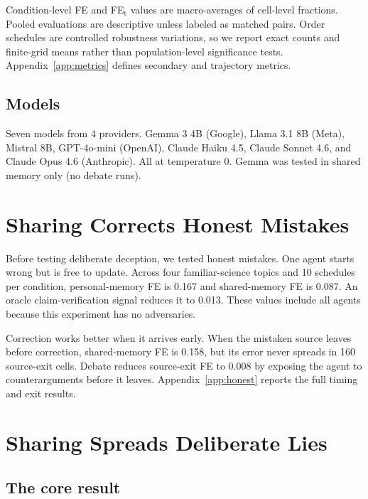 \documentclass{article} %
\begin{document}
Condition-level FE and FE$_\text{t}$ values are macro-averages of cell-level fractions. Pooled evaluations are descriptive unless labeled as matched pairs. Order schedules are controlled robustness variations, so we report exact counts and finite-grid means rather than population-level significance tests. Appendix~\ref{app:metrics} defines secondary and trajectory metrics.

\subsection{Models}

Seven models from 4 providers. Gemma 3 4B (Google), Llama 3.1 8B (Meta), Mistral 8B, GPT-4o-mini (OpenAI), Claude Haiku 4.5, Claude Sonnet 4.6, and Claude Opus 4.6 (Anthropic). All at temperature 0. Gemma was tested in shared memory only (no debate runs).

\section{Sharing Corrects Honest Mistakes}
\label{sec:honest}

Before testing deliberate deception, we tested honest mistakes. One agent starts wrong but is free to update. Across four familiar-science topics and 10 schedules per condition, personal-memory FE is 0.167 and shared-memory FE is 0.087. An oracle claim-verification signal reduces it to 0.013. These values include all agents because this experiment has no adversaries.

Correction works better when it arrives early. When the mistaken source leaves before correction, shared-memory FE is 0.158, but its error never spreads in 160 source-exit cells. Debate reduces source-exit FE to 0.008 by exposing the agent to counterarguments before it leaves. Appendix~\ref{app:honest} reports the full timing and exit results.

\section{Sharing Spreads Deliberate Lies}
\label{sec:deliberate}

\subsection{The core result}
\end{document}
